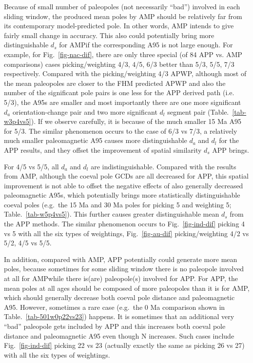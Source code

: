 Because of small number of paleopoles (not necessarily ``bad'') involved in
each sliding window, the produced mean poles by AMP should be relatively far
from its contemporary model-predicted pole. In other words, AMP intends to give
fairly small change in accuracy. This also could potentially bring more
distinguishable $d_s$ for AMP\@ if the corresponding A95 is not large enough.
For example, for Fig.~\ref{fig-nac-dif}, there are only three special (of 84 APP
vs. AMP comparisons) cases picking/weighting 4/3, 4/5, 6/3 better than 5/3, 5/5,
7/3 respectively. Compared with the picking/weighting 4/3 APWP, although most of
the mean paleopoles are closer to the FHM predicted APWP and also the number of
the significant pole pairs is one less for the APP derived path (i.e. 5/3), the
A95s are smaller and most importantly there are one more significant $d_a$
orientation-change pair and two more significant $d_l$ segment pair
(Table.~\ref{tab-w3p4vs5}). If we observe carefully, it is because of the much
smaller 15 Ma A95 for 5/3. The similar phenomenon occurs to the case of 6/3 vs
7/3, a relatively much smaller paleomagnetic A95 causes more distinguishable
$d_a$ and $d_l$ for the APP results, and they offset the improvement of spatial
similarity $d_s$ APP brings.

For 4/5 vs 5/5, all $d_a$ and $d_l$ are indistinguishable. Compared with the
results from AMP, although the coeval pole GCDs are all decreased for APP, this
spatial improvement is not able to offset the negative effects of also
generally decreased paleomagnetic A95s, which potentially brings more
statistically distinguishable coeval poles (e.g.\ the 15 Ma and 30 Ma poles for
picking 5 and weighting 5; Table.~\ref{tab-w5p4vs5}). This further causes
greater distinguishable mean $d_s$ from the APP methods. The similar phenomenon
occurs to Fig.~\ref{fig-ind-dif} picking 4 vs 5 with all the six types of
weightings, Fig.~\ref{fig-au-dif} picking/weighting 4/2 vs
5/2, 4/5 vs 5/5.

In addition, compared with AMP, APP potentially could generate more mean poles,
because sometimes for some sliding window there is no paleopole involved at all
for AMP\@ while there is(are) paleopole(s) involved for APP\@. For APP, the
mean poles at all ages should be composed of more paleopoles than it is for
AMP, which should generally decrease both coeval pole distance and paleomagnetic
A95. However, sometimes a rare case (e.g.\ the 0 Ma comparison shown in
Table.~\ref{tab-501w0p22vs23}) happens. It is sometimes that an additional
very ``bad'' paleopole gets included by APP and this increases both coeval pole
distance and paleomagnetic A95 even though N increases. Such cases include
Fig.~\ref{fig-ind-dif} picking 22 vs 23 (actually exactly the same as picking 26
vs 27) with all the six types of weightings.


